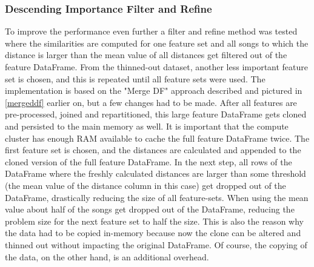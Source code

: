 \subsubsection{Descending Importance Filter and Refine}\label{farfs}

To improve the performance even further a filter and refine method was tested where the similarities are computed for one feature set and all songs to which the distance is larger than the mean value of all distances get filtered out of the feature DataFrame. From the thinned-out dataset, another less important feature set is chosen, and this is repeated until all feature sets were used. 
The implementation is based on the "Merge DF" approach described and pictured in \ref{mergeddf} earlier on, but a few changes had to be made. After all features are pre-processed, joined and repartitioned, this large feature DataFrame gets cloned and persisted to the main memory as well. It is important that the compute cluster has enough RAM available to cache the full feature DataFrame twice. 
\noindent The first feature set is chosen, and the distances are calculated and appended to the cloned version of the full feature DataFrame. In the next step, all rows of the DataFrame where the freshly calculated distances are larger than some threshold (the mean value of the distance column in this case) get dropped out of the DataFrame, drastically reducing the size of all feature-sets.
When using the mean value about half of the songs get dropped out of the DataFrame, reducing the problem size for the next feature set to half the size. This is also the reason why the data had to be copied in-memory because now the clone can be altered and thinned out without impacting the original DataFrame. Of course, the copying of the data, on the other hand, is an additional overhead. 

